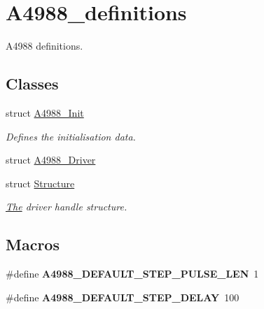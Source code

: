 \hypertarget{group__A4988__definitions}{}\section{A4988\+\_\+definitions}
\label{group__A4988__definitions}


A4988 definitions.  


\subsection*{Classes}
\begin{DoxyCompactItemize}
\item 
struct \hyperlink{structA4988__Init}{A4988\+\_\+\+Init}
\begin{DoxyCompactList}\small\item\em Defines the initialisation data. \end{DoxyCompactList}\item 
struct \hyperlink{structA4988__Driver}{A4988\+\_\+\+Driver}
\item 
struct \hyperlink{structStructure}{Structure}
\begin{DoxyCompactList}\small\item\em \hyperlink{structThe}{The} driver handle structure. \end{DoxyCompactList}\end{DoxyCompactItemize}
\subsection*{Macros}
\begin{DoxyCompactItemize}
\item 
\mbox{\label{group__A4988__definitions_ga9d3d53a87f2a26595e794a30ce127c1c}} 
\#define {\bfseries A4988\+\_\+\+D\+E\+F\+A\+U\+L\+T\+\_\+\+S\+T\+E\+P\+\_\+\+P\+U\+L\+S\+E\+\_\+\+L\+EN}~1
\item 
\mbox{\label{group__A4988__definitions_gae78d12b3efc4815a96899916270aa376}} 
\#define {\bfseries A4988\+\_\+\+D\+E\+F\+A\+U\+L\+T\+\_\+\+S\+T\+E\+P\+\_\+\+D\+E\+L\+AY}~100
\end{DoxyCompactItemize}
